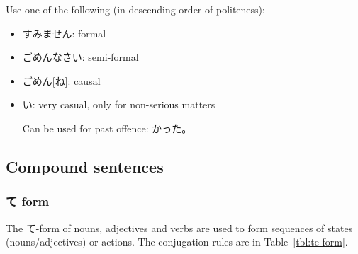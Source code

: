 \documentclass[../nihongo-gakushuu-kyouzai.tex]{subfiles}
\begin{document}
Use one of the following (in descending order of politeness):
\begin{itemize}
    \item すみません: formal
    \item ごめんなさい: semi-formal
    \item ごめん[ね]: causal
    \item {}い: very casual, only for non-serious matters

    Can be used for past offence: かった。
\end{itemize}

\subsection{Compound sentences}

\subsubsection{て form}

The て-form of nouns, adjectives and verbs are used to form sequences of states (nouns/adjectives) or actions. The conjugation rules are in Table~\ref{tbl:te-form}.
\end{document}
